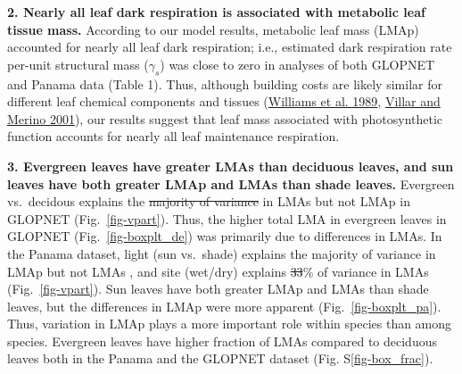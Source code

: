 \documentclass[
  12pt,
  a4paper,
,tablecaptionabove
]{scrartcl}
\providecommand{\DIFaddtex}[1]{{\protect\color{blue}\uwave{#1}}} %
\providecommand{\DIFdeltex}[1]{{\protect\color{red}\sout{#1}}}                      %
\providecommand{\DIFaddbegin}{} %
\providecommand{\DIFaddend}{} %
\providecommand{\DIFdelbegin}{} %
\providecommand{\DIFdelend}{} %
\providecommand{\DIFadd}[1]{\texorpdfstring{\DIFaddtex{#1}}{#1}} %
\providecommand{\DIFdel}[1]{\texorpdfstring{\DIFdeltex{#1}}{}} %
\newcommand{\DIFscaledelfig}{0.5}
\newlength{\DIFdelgraphicswidth} %
\newlength{\DIFdelgraphicsheight} %
\newcommand{\DIFaddincludegraphics}[2][]{{\color{blue}\fbox{\DIFOincludegraphics[#1]{#2}}}} %
\newcommand{\DIFdelincludegraphics}[2][]{%
\sbox{\DIFdelgraphicsbox}{\DIFOincludegraphics[#1]{#2}}%
\settoboxwidth{\DIFdelgraphicswidth}{\DIFdelgraphicsbox} %
\settoboxtotalheight{\DIFdelgraphicsheight}{\DIFdelgraphicsbox} %
\scalebox{\DIFscaledelfig}{%
\parbox[b]{\DIFdelgraphicswidth}{\usebox{\DIFdelgraphicsbox}\\[-\baselineskip] \rule{\DIFdelgraphicswidth}{0em}}\llap{\resizebox{\DIFdelgraphicswidth}{\DIFdelgraphicsheight}{%
\setlength{\unitlength}{\DIFdelgraphicswidth}%
\begin{picture}(1,1)%
\thicklines\linethickness{2pt} %
{\color[rgb]{1,0,0}\put(0,0){\framebox(1,1){}}}%
{\color[rgb]{1,0,0}\put(0,0){\line( 1,1){1}}}%
{\color[rgb]{1,0,0}\put(0,1){\line(1,-1){1}}}%
\end{picture}%
}\hspace*{3pt}}} %
} %
\DeclareRobustCommand{\DIFaddbegin}{\DIFOaddbegin \let\includegraphics\DIFaddincludegraphics} %
\DeclareRobustCommand{\DIFaddend}{\DIFOaddend \let\includegraphics\DIFOincludegraphics} %
\DeclareRobustCommand{\DIFdelbegin}{\DIFOdelbegin \let\includegraphics\DIFdelincludegraphics} %
\DeclareRobustCommand{\DIFdelend}{\DIFOaddend \let\includegraphics\DIFOincludegraphics} %
\begin{document}
\textbf{2. Nearly all leaf dark respiration is associated with metabolic
leaf tissue mass.} According to our model results, metabolic leaf mass
(LMAp) accounted for nearly all leaf dark respiration; i.e., estimated
dark respiration rate per-unit structural mass (\(\gamma_s\)) was close
to zero in analyses of both GLOPNET and Panama data (Table 1). Thus,
although building costs are likely similar for different leaf chemical
components and tissues (\protect\hyperlink{ref-Williams1989}{Williams et
al. 1989}, \protect\hyperlink{ref-Villar2001}{Villar and Merino 2001}),
our results suggest that leaf mass associated with photosynthetic
function accounts for nearly all leaf maintenance respiration.

\textbf{3. Evergreen leaves have greater LMAs than deciduous leaves, and
sun leaves have both greater LMAp and LMAs than shade leaves.} Evergreen
vs.~decidous explains the \DIFdelbegin \DIFdel{majority of variance }\DIFdelend \DIFaddbegin \DIFadd{large variance (39.0\%) }\DIFaddend in LMAs but not LMAp
in GLOPNET (Fig.~\ref{fig-vpart}). Thus, the higher total LMA in
evergreen leaves in GLOPNET (Fig.~\ref{fig-boxplt_de}) was primarily due
to differences in LMAs. In the Panama dataset, light (sun vs.~shade)
explains the majority of variance in LMAp \DIFaddbegin \DIFadd{(75.6\%) }\DIFaddend but not LMAs \DIFaddbegin \DIFadd{(18.3\%)
}\DIFaddend , and site (wet/dry) explains \DIFdelbegin \DIFdel{33}\DIFdelend \DIFaddbegin \DIFadd{25.9}\DIFaddend \% of variance in LMAs
(Fig.~\ref{fig-vpart}). Sun leaves have both greater LMAp and LMAs than
shade leaves, but the differences in LMAp were more apparent
(Fig.~\ref{fig-boxplt_pa}). Thus, variation in LMAp plays a more
important role within species than among species. Evergreen leaves have
higher fraction of LMAs compared to deciduous leaves both in the Panama
and the GLOPNET dataset (Fig. S\ref{fig-box_frac}).
\end{document}

